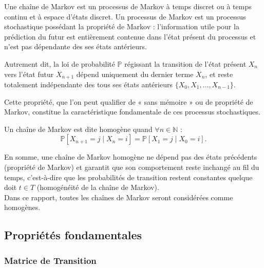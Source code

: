 \documentclass{article}
\begin{document}
Une chaîne de Markov est un processus de Markov à temps discret ou à temps continu et à espace d'états discret. Un processus de Markov est un processus stochastique possédant la propriété de Markov : l'information utile pour la prédiction du futur est entièrement contenue dans l'état présent du processus et n'est pas dépendante des ses états antérieurs.

Autrement dit, la loi de probabilité $\mathbb{P}$ régissant la transition de l'état présent $X_n$ vers l'état futur $X_{n+1}$ dépend uniquement du dernier terme $X_n$, et reste totalement indépendante des tous ses états antérieurs $\{X_0, X_1, \dots, X_{n-1}\}$.

Cette propriété, que l'on peut qualifier de « sans mémoire » ou de propriété de Markov, constitue la caractéristique fondamentale de ces processus stochastiques. \\

\begin{tcolorbox}[colback=white,colframe=blue!80!black,title=Chaine de Markov Homogène]
Un chaîne de Markov est dite homogène quand $\forall n \in \mathbb{N}$ :
\[
  \mathbb{P}[X_{n+1} = j \mid X_n = i] = \mathbb{P}[X_1 = j \mid X_0 = i].
\]
\end{tcolorbox}

En somme, une chaîne de Markov homogène ne dépend pas des états précédents (propriété de Markov) et garantit que son comportement reste inchangé au fil du temps, c'est-à-dire que les probabilités de transition restent constantes quelque doit $t \in T$ (homogénéité de la chaîne de Markov). \\
Dans ce rapport, toutes les chaînes de Markov seront considérées comme homogènes.

\newpage %
\subsection{Propriétés fondamentales}


\subsubsection{Matrice de Transition}
\end{document}
